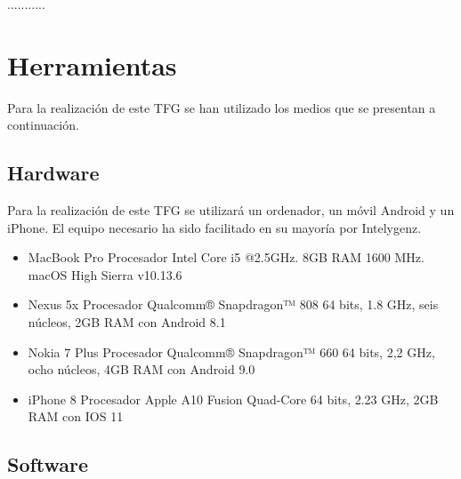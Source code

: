 ...........


\section{Herramientas}

Para la realización de este \acs{TFG} se han utilizado los medios que se presentan a continuación.

\subsection{Hardware}

Para la realización de este TFG se utilizará un ordenador, un móvil Android y un iPhone. El equipo 
necesario ha sido facilitado en su mayoría por Intelygenz.

\begin{itemize}
	\item MacBook Pro Procesador Intel Core i5 @2.5GHz. 8GB RAM 1600 MHz. macOS High Sierra v10.13.6
	\item Nexus 5x Procesador Qualcomm® Snapdragon™ 808 64 bits, 1.8 GHz, seis núcleos, 2GB RAM con Android 8.1
	\item Nokia 7 Plus Procesador Qualcomm® Snapdragon™ 660 64 bits, 2,2 GHz, ocho núcleos, 4GB RAM con Android 9.0
	\item iPhone 8 Procesador Apple A10 Fusion Quad-Core 64 bits, 2.23 GHz, 2GB RAM con IOS 11
\end{itemize}

\subsection{Software}

